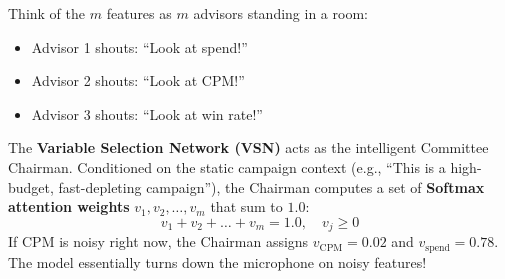 \documentclass[11pt,a4paper]{article}
\begin{document}
\begin{intuitionbox}
Think of the $m$ features as $m$ advisors standing in a room:
\begin{itemize}
    \item Advisor 1 shouts: ``Look at spend!''
    \item Advisor 2 shouts: ``Look at CPM!''
    \item Advisor 3 shouts: ``Look at win rate!''
\end{itemize}
The \textbf{Variable Selection Network (VSN)} acts as the intelligent Committee Chairman. Conditioned on the static campaign context (e.g., ``This is a high-budget, fast-depleting campaign''), the Chairman computes a set of \textbf{Softmax attention weights} $v_1, v_2, \dots, v_m$ that sum to $1.0$:
\begin{equation}
    v_1 + v_2 + \dots + v_m = 1.0, \quad v_j \ge 0
\end{equation}
If CPM is noisy right now, the Chairman assigns $v_{\text{CPM}} = 0.02$ and $v_{\text{spend}} = 0.78$. The model essentially turns down the microphone on noisy features!
\end{intuitionbox}
\end{document}
